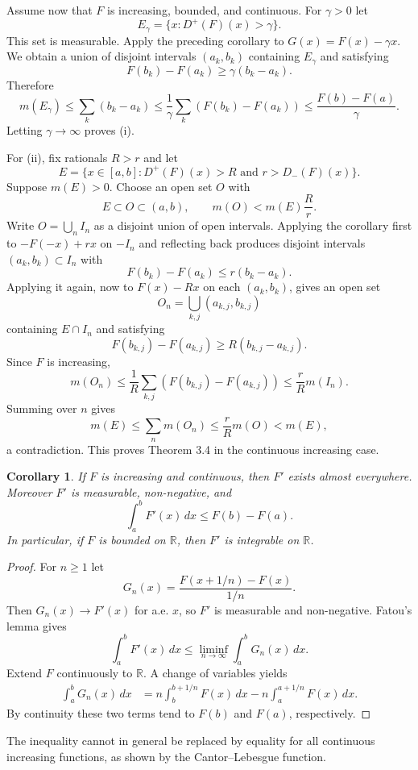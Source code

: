 \documentclass[11pt,openany]{book}
\newtheorem{corollary}[theorem]{Corollary}
\begin{document}
Assume now that $F$ is increasing, bounded, and continuous. For $\gamma>0$ let
\[
E_\gamma=\{x:D^+(F)(x)>\gamma\}.
\]
This set is measurable. Apply the preceding corollary to $G(x)=F(x)-\gamma x$. We obtain a union of disjoint intervals $(a_k,b_k)$ containing $E_\gamma$ and satisfying
\[
F(b_k)-F(a_k)\ge\gamma(b_k-a_k).
\]
Therefore
\[
m(E_\gamma)
\le \sum_k(b_k-a_k)
\le \frac1\gamma\sum_k(F(b_k)-F(a_k))
\le \frac{F(b)-F(a)}\gamma.
\]
Letting $\gamma\to\infty$ proves (i).

For (ii), fix rationals $R>r$ and let
\[
E=\{x\in[a,b]:D^+(F)(x)>R\text{ and }r>D_-(F)(x)\}.
\]
Suppose $m(E)>0$. Choose an open set $O$ with
\[
E\subset O\subset(a,b),\qquad m(O)<m(E)\frac Rr.
\]
Write $O=\bigcup_n I_n$ as a disjoint union of open intervals. Applying the corollary first to $-F(-x)+rx$ on $-I_n$ and reflecting back produces disjoint intervals $(a_k,b_k)\subset I_n$ with
\[
F(b_k)-F(a_k)\le r(b_k-a_k).
\]
Applying it again, now to $F(x)-Rx$ on each $(a_k,b_k)$, gives an open set
\[
O_n=\bigcup_{k,j}(a_{k,j},b_{k,j})
\]
containing $E\cap I_n$ and satisfying
\[
F(b_{k,j})-F(a_{k,j})\ge R(b_{k,j}-a_{k,j}).
\]
Since $F$ is increasing,
\[
m(O_n)
\le \frac1R\sum_{k,j}(F(b_{k,j})-F(a_{k,j}))
\le \frac rR m(I_n).
\]
Summing over $n$ gives
\[
m(E)\le\sum_n m(O_n)\le\frac rR m(O)<m(E),
\]
a contradiction. This proves Theorem 3.4 in the continuous increasing case.

\begin{corollary}
If $F$ is increasing and continuous, then $F'$ exists almost everywhere. Moreover $F'$ is measurable, non-negative, and
\[
\int_a^bF'(x)\,dx\le F(b)-F(a).
\]
In particular, if $F$ is bounded on $\mathbb R$, then $F'$ is integrable on $\mathbb R$.
\end{corollary}

\begin{proof}
For $n\ge1$ let
\[
G_n(x)=\frac{F(x+1/n)-F(x)}{1/n}.
\]
Then $G_n(x)\to F'(x)$ for a.e. $x$, so $F'$ is measurable and non-negative. Fatou's lemma gives
\[
\int_a^bF'(x)\,dx\le\liminf_{n\to\infty}\int_a^bG_n(x)\,dx.
\]
Extend $F$ continuously to $\mathbb R$. A change of variables yields
\begin{align*}
\int_a^bG_n(x)\,dx
&=n\int_b^{b+1/n}F(x)\,dx
-n\int_a^{a+1/n}F(x)\,dx.
\end{align*}
By continuity these two terms tend to $F(b)$ and $F(a)$, respectively.
\end{proof}

The inequality cannot in general be replaced by equality for all continuous increasing functions, as shown by the Cantor--Lebesgue function.
\end{document}
